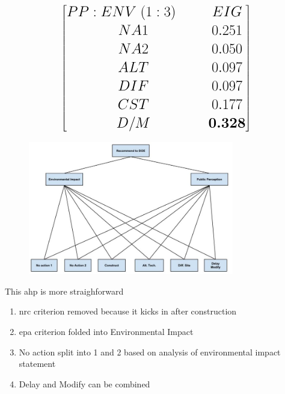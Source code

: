\documentclass[aspectratio=1610,pdftex,dvipsnames,compress,xcolor={dvipsnames}]{beamer}
\newcommand{\acs}{\acrshort} %
\begin{document}
\begin{frame}{}
    \begin{equation}
        \LARGE
        \begin{bmatrix}
            PP:ENV \; (1:3) \;\;\;\;\;\; &EIG \\ 
            NA1 &0.251 \\ 
            NA2 &0.050 \\ 
            ALT &0.097 \\ 
            DIF &0.097 \\ 
            CST &0.177 \\ 
            D/M &\textbf{0.328}
        \end{bmatrix} 
    \end{equation}
\end{frame}


\begin{frame}{}
    \begin{figure}
        \centering
        \includegraphics[width=0.80\textwidth]{ahp_final.jpg}
    \end{figure}
\end{frame}


\begin{frame}{This \acs{ahp} is more straighforward}
    \begin{enumerate}[series=outerlist,topsep=0pt,itemsep=21pt,leftmargin=*,label=(\arabic*)]
        \item[]\acs{nrc} criterion removed because it kicks in after construction
        \item[]\acs{epa} criterion folded into Environmental Impact
        \item[]No action split into 1 and 2 based on analysis of environmental impact statement
        \item[]Delay and Modify can be combined
    \end{enumerate}
\end{frame}
\end{document}
